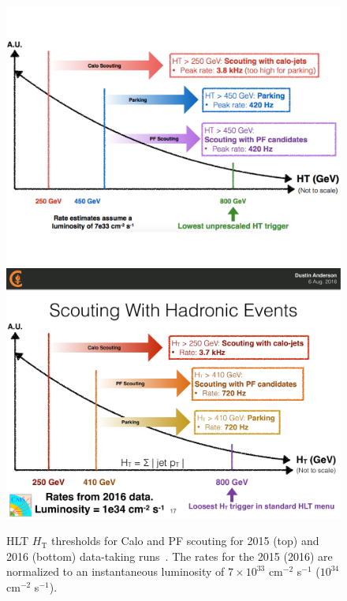 \begin{figure}\centering
\includegraphics[width=.9\textwidth]{figs/cms/Scouting2015.pdf}\\
\includegraphics[width=.9\textwidth]{figs/cms/Scouting2016.pdf}
\caption{HLT $H_\mathrm{T}$ thresholds for Calo and PF scouting for
  2015 (top) and 2016 (bottom) data-taking runs~\cite{AndersonScouting}. The
  rates for the 2015 (2016) are normalized to an instantaneous luminosity
  of $7\times 10^{33}$ cm$^{-2}$ s$^{-1}$ ($10^{34}$ cm$^{-2}$
  s$^{-1}$). \label{fig:DataScouting}}
\end{figure}

